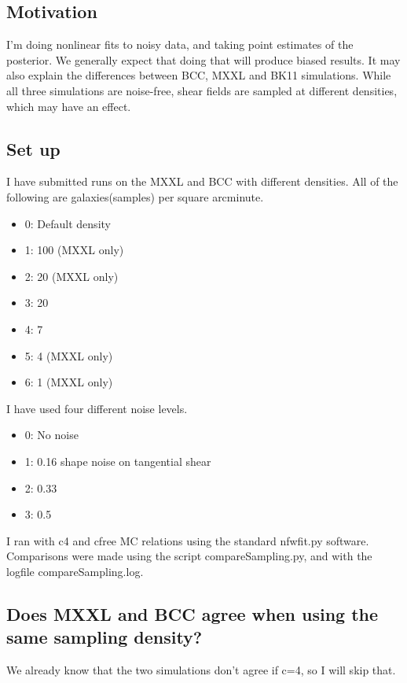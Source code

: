 \documentclass[11pt]{article}
\begin{document}
\subsection{Motivation}
I'm doing nonlinear fits to noisy data, and taking point estimates of the posterior. We generally expect that doing that will produce biased results. It may also explain the differences between BCC, MXXL and BK11 simulations. While all three simulations are noise-free, shear fields are sampled at different densities, which may have an effect.

\subsection{Set up}

I have submitted runs on the MXXL and BCC with different densities. All of the following are galaxies(samples) per square arcminute.
\begin{itemize}
\item 0: Default density
\item 1: 100 (MXXL only)
\item 2: 20 (MXXL only)
\item 3: 20
\item 4: 7
\item 5: 4  (MXXL only)
\item 6: 1  (MXXL only)
\end{itemize}

I have used four different noise levels.
\begin{itemize}
\item 0: No noise
\item 1: 0.16 shape noise on tangential shear
\item 2: 0.33
\item 3: 0.5
\end{itemize}

I ran with c4 and cfree MC relations using the standard nfwfit.py software. Comparisons were made using the script compareSampling.py, and with the logfile compareSampling.log.



\subsection{Does MXXL and BCC agree when using the same sampling density?}

We already know that the two simulations don't agree if c=4, so I will skip that.
\end{document}
